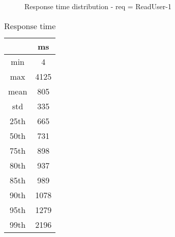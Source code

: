 \begin{minipage}{0.75\linewidth}
\begin{figure}[h]
\begin{adjustbox}{max width=1.0\linewidth, keepaspectratio}
  \end{adjustbox}
  \caption{Response time distribution - req = ReadUser-1}
\end{figure}
\end{minipage}\hfill\begin{minipage}{0.18\linewidth}
\begin{table}[h]
\begin{tabular}{|cc|}
\hline
\textbf{} & \textbf{ms}\\ \hline
 \Xhline{0.005\arrayrulewidth}
min & 4\\
 \Xhline{0.005\arrayrulewidth}
max & 4125\\
 \Xhline{0.005\arrayrulewidth}
mean & 805\\
 \Xhline{0.005\arrayrulewidth}
std & 335\\
\hline
\hline
 \Xhline{0.005\arrayrulewidth}
25th & 665\\
 \Xhline{0.005\arrayrulewidth}
50th & 731\\
 \Xhline{0.005\arrayrulewidth}
75th & 898\\
 \Xhline{0.005\arrayrulewidth}
80th & 937\\
 \Xhline{0.005\arrayrulewidth}
85th & 989\\
 \Xhline{0.005\arrayrulewidth}
90th & 1078\\
 \Xhline{0.005\arrayrulewidth}
95th & 1279\\
 \Xhline{0.005\arrayrulewidth}
99th & 2196\\
\hline
\end{tabular}
\caption{Response time}
\end{table}
\end{minipage}\hfill